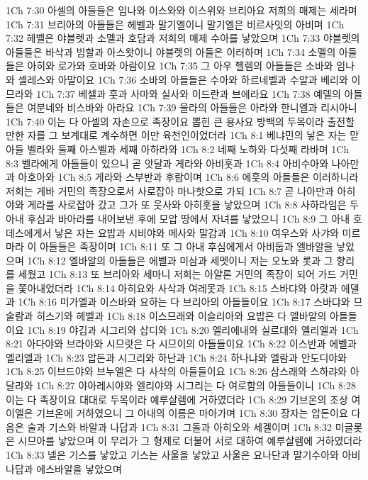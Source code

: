 1Ch 7:30  아셀의 아들들은 임나와 이스와와 이스위와 브리아요 저희의 매제는 세라며
1Ch 7:31  브리아의 아들들은 헤벨과 말기엘이니 말기엘은 비르사잇의 아비며
1Ch 7:32  헤벨은 야블렛과 소멜과 호담과 저희의 매제 수아를 낳았으며
1Ch 7:33  야블렛의 아들들은 바삭과 빔할과 아스왓이니 야블렛의 아들은 이러하며
1Ch 7:34  소멜의 아들들은 아히와 로가와 호바와 아람이요
1Ch 7:35  그 아우 헬렘의 아들들은 소바와 임나와 셀레스와 아말이요
1Ch 7:36  소바의 아들들은 수아와 하르네벨과 수알과 베리와 이므라와
1Ch 7:37  베셀과 훗과 사마와 실사와 이드란과 브에라요
1Ch 7:38  예델의 아들들은 여분네와 비스바와 아라요
1Ch 7:39  울라의 아들들은 아라와 한니엘과 리시아니
1Ch 7:40  이는 다 아셀의 자손으로 족장이요 뽑힌 큰 용사요 방백의 두목이라 출전할만한 자를 그 보계대로 계수하면 이만 육천인이었더라
1Ch 8:1  베냐민의 낳은 자는 맏아들 벨라와 둘째 아스벨과 세째 아하라와
1Ch 8:2  네째 노하와 다섯째 라바며
1Ch 8:3  벨라에게 아들들이 있으니 곧 앗달과 게라와 아비훗과
1Ch 8:4  아비수아와 나아만과 아호아와
1Ch 8:5  게라와 스부반과 후람이며
1Ch 8:6  에훗의 아들들은 이러하니라 저희는 게바 거민의 족장으로서 사로잡아 마나핫으로 가되
1Ch 8:7  곧 나아만과 아히야와 게라를 사로잡아 갔고 그가 또 웃사와 아히훗을 낳았으며
1Ch 8:8  사하라임은 두 아내 후심과 바아라를 내어보낸 후에 모압 땅에서 자녀를 낳았으니
1Ch 8:9  그 아내 호데스에게서 낳은 자는 요밥과 시비야와 메사와 말감과
1Ch 8:10  여우스와 사갸와 미르마라 이 아들들은 족장이며
1Ch 8:11  또 그 아내 후심에게서 아비둡과 엘바알을 낳았으며
1Ch 8:12  엘바알의 아들들은 에벨과 미삼과 세멧이니 저는 오노와 롯과 그 향리를 세웠고
1Ch 8:13  또 브리아와 세마니 저희는 아얄론 거민의 족장이 되어 가드 거민을 쫓아내었더라
1Ch 8:14  아히요와 사삭과 여레못과
1Ch 8:15  스바댜와 아랏과 에델과
1Ch 8:16  미가엘과 이스바와 요하는 다 브리아의 아들들이요
1Ch 8:17  스바댜와 므술람과 히스기와 헤벨과
1Ch 8:18  이스므래와 이슬리아와 요밥은 다 엘바알의 아들들이요
1Ch 8:19  야김과 시그리와 삽디와
1Ch 8:20  엘리에내와 실르대와 엘리엘과
1Ch 8:21  아다야와 브라야와 시므랏은 다 시므이의 아들들이요
1Ch 8:22  이스반과 에벨과 엘리엘과
1Ch 8:23  압돈과 시그리와 하난과
1Ch 8:24  하나냐와 엘람과 안도디야와
1Ch 8:25  이브드야와 브누엘은 다 사삭의 아들들이요
1Ch 8:26  삼스래와 스하랴와 아달랴와
1Ch 8:27  야아레시야와 엘리야와 시그리는 다 여로함의 아들들이니
1Ch 8:28  이는 다 족장이요 대대로 두목이라 예루살렘에 거하였더라
1Ch 8:29  기브온의 조상 여이엘은 기브온에 거하였으니 그 아내의 이름은 마아가며
1Ch 8:30  장자는 압돈이요 다음은 술과 기스와 바알과 나답과
1Ch 8:31  그돌과 아히오와 세겔이며
1Ch 8:32  미글롯은 시므아를 낳았으며 이 무리가 그 형제로 더불어 서로 대하여 예루살렘에 거하였더라
1Ch 8:33  넬은 기스를 낳았고 기스는 사울을 낳았고 사울은 요나단과 말기수아와 아비나답과 에스바알을 낳았으며
